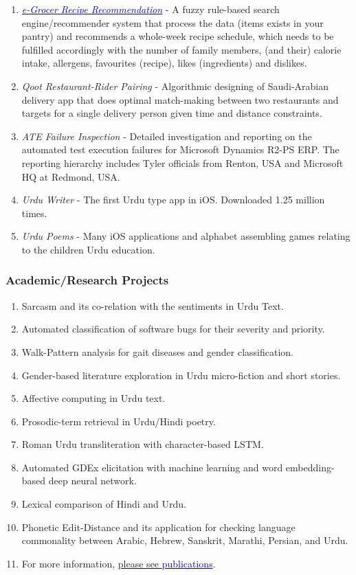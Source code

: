 \documentclass[a4paper, 10pt]{article}
\begin{document}
\begin{enumerate}
\item \emph{ \href{https://play.google.com/store/apps/details?id=com.egrocer&hl=en&gl=US}{\textcolor{MediumBlue}{e-Grocer Recipe Recommendation}}} - A fuzzy rule-based search engine/recommender system that process the data (items exists in your pantry) and recommends a whole-week recipe schedule, which needs to be fulfilled accordingly with the number of family members, (and their) calorie intake, allergens, favourites (recipe), likes (ingredients) and dislikes.

\item \emph{ Qoot Restaurant-Rider Pairing} - Algorithmic designing of Saudi-Arabian delivery app that does optimal match-making between two restaurants and targets for a single delivery person given time and distance constraints.

\item \emph{ ATE Failure Inspection} - Detailed investigation and reporting on the automated test execution failures for Microsoft Dynamics R2-PS ERP. The reporting hierarchy includes Tyler officials from Renton, USA and Microsoft HQ at Redmond, USA.

\item \emph{ Urdu Writer} - The first Urdu type app in iOS. Downloaded 1.25 million times.

\item \emph{ Urdu Poems} - Many iOS applications and alphabet assembling games relating to the children Urdu education.
\end{enumerate}
\subsubsection*{Academic/Research Projects}
\begin{enumerate}
\itemsep = 0em
\item Sarcasm and its co-relation with the sentiments in Urdu Text.
\item Automated classification of software bugs for their severity and priority.
\item Walk-Pattern analysis for gait diseases and gender classification.
\item Gender-based literature exploration in Urdu micro-fiction and short stories.
\item Affective computing in Urdu text.
\item Prosodic-term retrieval in Urdu/Hindi poetry.
\item Roman Urdu transliteration with character-based LSTM.
\item Automated GDEx elicitation with machine learning and word embedding-based deep neural network.
\item Lexical comparison of Hindi and Urdu.
\item Phonetic Edit-Distance and its application for checking language commonality between Arabic, Hebrew, Sanskrit, Marathi, Persian, and Urdu.
\item For more information, \hyperref[publications]{please see \textcolor{MediumBlue}{publications}}.
\end{enumerate}
\end{document}
